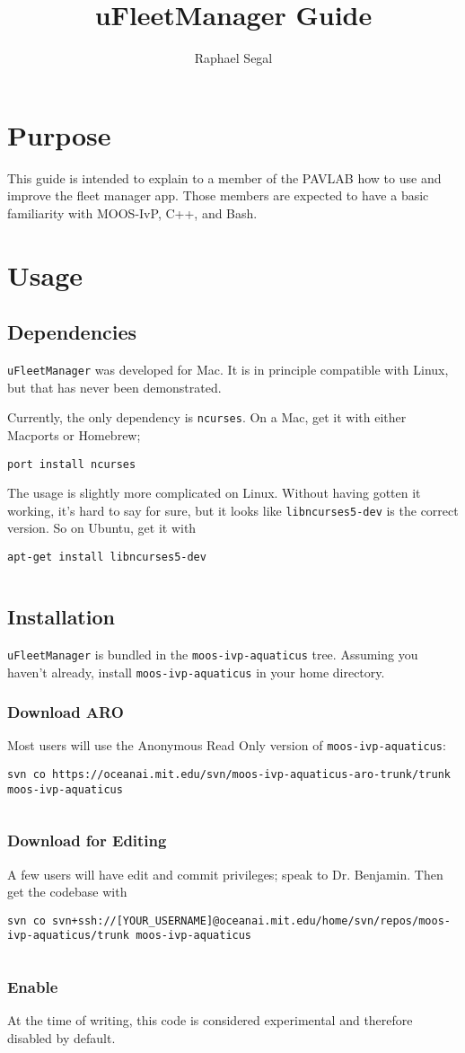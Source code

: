 \documentclass[11pt]{article}
\author{Raphael Segal}
\title{uFleetManager Guide}
\newcommand{\cmdline}[1]{\vspace{.2em} $\:$\\ \begin{minipage}{\dimexpr\textwidth-2cm}
\texttt{#1}
\end{minipage} $\:$\\ \vspace{-.2em} }
\begin{document}
\maketitle
\section{Purpose}
This guide is intended to explain to a member of the PAVLAB how to use and improve the fleet manager app. Those members are expected to have a basic familiarity with MOOS-IvP, C++, and Bash.
\section{Usage}
\subsection{Dependencies}
\texttt{uFleetManager} was developed for Mac. It is in principle compatible with Linux, but that has never been demonstrated.

Currently, the only dependency is \texttt{ncurses}. On a Mac, get it with either Macports or Homebrew;
\cmdline{port install ncurses}
The usage is slightly more complicated on Linux. Without having gotten it working, it's hard to say for sure, but it looks like \texttt{libncurses5-dev} is the correct version. So on Ubuntu, get it with
\cmdline{apt-get install libncurses5-dev}
\subsection{Installation}
\texttt{uFleetManager} is bundled in the \texttt{moos-ivp-aquaticus} tree. Assuming you haven't already, install \texttt{moos-ivp-aquaticus} in your home directory.
\subsubsection{Download ARO}
Most users will use the Anonymous Read Only version of \texttt{moos-ivp-aquaticus}: 
\cmdline{svn co https://oceanai.mit.edu/svn/moos-ivp-aquaticus-aro-trunk/trunk moos-ivp-aquaticus}
\subsubsection{Download for Editing}
A few users will have edit and commit privileges; speak to Dr. Benjamin. Then get the codebase with
\cmdline{svn co svn+ssh://[YOUR\_USERNAME]@oceanai.mit.edu/home/svn/repos/moos-ivp-aquaticus/trunk moos-ivp-aquaticus}
\subsubsection{Enable}
At the time of writing, this code is considered experimental and therefore disabled by default.
\end{document}
